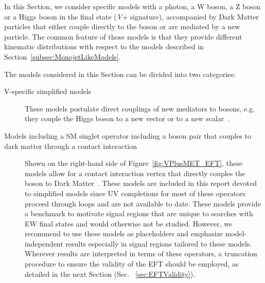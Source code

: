 
In this Section, we consider specific models with a photon, a W boson, a Z boson or a Higgs boson in the final state (\textit{V+\MET} signature), accompanied by Dark Matter particles that either couple directly to the boson or are mediated by a new particle. The common feature of those models is that they provide different kinematic distributions with respect to the models described in Section~\ref{subsec:MonojetLikeModels}.


The models considered in this Section can be divided into two categories:
\begin{description}
 \item[V-specific simplified models] These models postulate direct couplings of new mediators
 to bosons, e.g. they couple the Higgs boson to a new vector or to a new scalar~\cite{Carpenter:2013xra,Berlin:2014cfa}. 
 \item[Models including a SM singlet operator  including a boson pair that couples to dark matter through a contact interaction]
 Shown on the right-hand side of Figure~\ref{fig:VPlusMET_EFT},
 these models allow for a contact interaction vertex that directly couples the boson to Dark Matter~\cite{Cotta:2012nj, Carpenter:2012rg, Crivellin:2015wva,Berlin:2014cfa}.
 These models are included in this report devoted to simplified models since 
 UV completions for most of these operators proceed through loops and are not available to date. 
 These models provide a benchmark to motivate signal regions that are unique to searches with
 EW final states and would otherwise not be studied. However, we recommend to use these models
 as placeholders and emphasize model-independent results especially in signal regions tailored to these models. 
 Wherever results are interpreted in terms of these operators, a truncation procedure
 to ensure the validity of the EFT should be employed, as detailed in the next Section (Sec. ~\ref{sec:EFTValidity}). 
\end{description}

